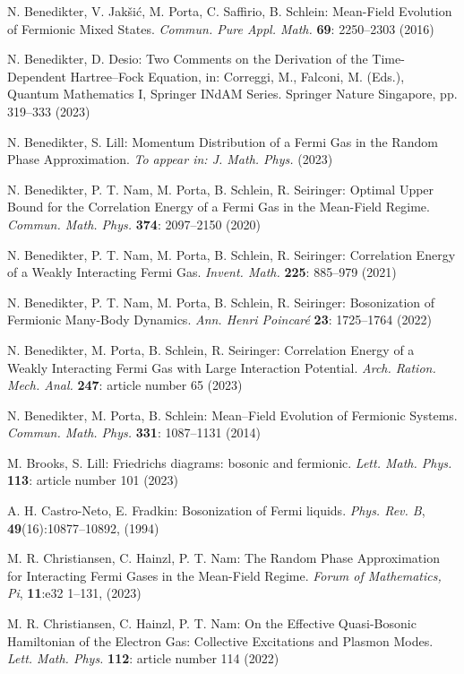 \documentclass[12pt,a4paper]{article}
\numberwithin{equation}{section}
\newcommand{\1}{\mathbb{I}}
\theoremstyle{plain}
\theoremstyle{definition}
\theoremstyle{remark}
\theoremstyle{plain}
\theoremstyle{definition}
\theoremstyle{remark}
\begin{document}
\begin{thebibliography}{29}
N. Benedikter, V. Jakšić, M. Porta, C. Saffirio, B. Schlein:
	Mean-Field Evolution of Fermionic Mixed States.
	\emph{Commun. Pure Appl. Math.} \textbf{69}: 2250--2303 (2016)

N. Benedikter, D. Desio:
	Two Comments on the Derivation of the Time-Dependent Hartree–Fock Equation, in: Correggi, M., Falconi, M. (Eds.), Quantum Mathematics I, Springer INdAM Series. Springer Nature Singapore, pp. 319--333 (2023)

N. Benedikter, S. Lill:
	Momentum Distribution of a Fermi Gas in the Random Phase Approximation.
	\emph{To appear in: J. Math. Phys.} (2023)

N. Benedikter, P. T. Nam, M. Porta, B. Schlein, R. Seiringer:
	Optimal Upper Bound for the Correlation Energy of a Fermi Gas in the Mean-Field Regime.
	\emph{Commun. Math. Phys.} {\bf 374}: 2097--2150 (2020)

N. Benedikter, P. T. Nam, M. Porta, B. Schlein, R. Seiringer:
	Correlation Energy of a Weakly Interacting Fermi Gas.
	\emph{Invent. Math.} {\bf 225}: 885--979 (2021)
	
N. Benedikter, P. T. Nam, M. Porta, B. Schlein, R. Seiringer:
	Bosonization of Fermionic Many-Body Dynamics.
	\emph{Ann. Henri Poincar\'e} {\bf 23}: 1725--1764 (2022)

N. Benedikter, M. Porta, B. Schlein, R. Seiringer:
	Correlation Energy of a Weakly Interacting Fermi Gas with Large Interaction Potential.
	\emph{Arch. Ration. Mech. Anal.} \textbf{247}: article number 65 (2023)

N. Benedikter, M. Porta, B. Schlein:
	Mean–Field Evolution of Fermionic Systems.
	\emph{Commun. Math. Phys.} \textbf{331}: 1087--1131 (2014)

M. Brooks, S. Lill:
	Friedrichs diagrams: bosonic and fermionic.
	\emph{Lett. Math. Phys.} {\bf 113}: article number 101 (2023)


A. H. Castro-Neto, E. Fradkin:
	Bosonization of {{Fermi}} liquids.
	\emph{Phys. Rev. B}, \textbf{49}(16):10877--10892, (1994)

M. R. Christiansen, C. Hainzl, P. T. Nam:
	The Random Phase Approximation for Interacting Fermi Gases in the Mean-Field Regime.
	\emph{Forum of Mathematics, Pi}, \textbf{11}:e32 1--131, (2023)

M. R. Christiansen, C. Hainzl, P. T. Nam:
	On the Effective Quasi-Bosonic Hamiltonian of the Electron Gas: Collective Excitations and Plasmon Modes.
	\emph{Lett. Math. Phys.} \textbf{112}: article number 114 (2022)


\end{thebibliography}
\end{document}
